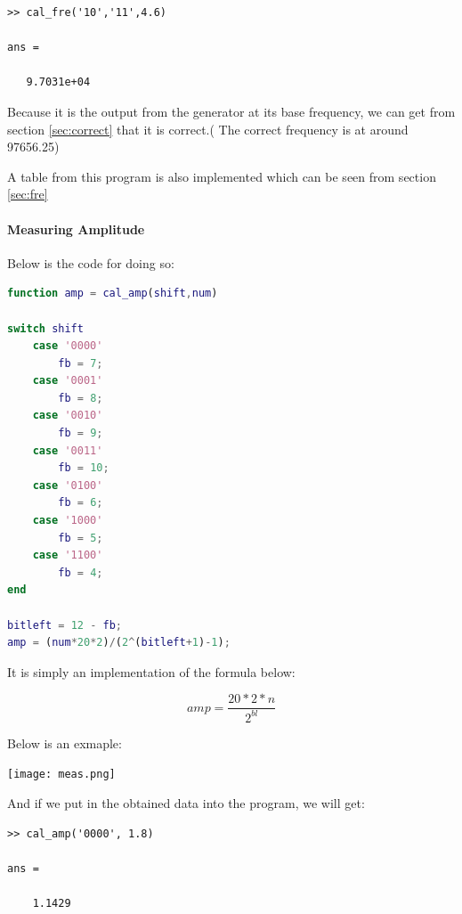 \documentclass[11pt]{scrartcl}
\begin{document}
\begin{verbatim}
>> cal_fre('10','11',4.6)

ans =

   9.7031e+04
\end{verbatim}

Because it is the output from the generator at its base frequency, we can get from section \ref{sec:correct} that it is correct.( The correct frequency is at around 97656.25)

A table from this program is also implemented which can be seen from section \ref{sec:fre}

\paragraph{Measuring Amplitude}
Below is the code for doing so:

\begin{lstlisting}[language=Matlab]
function amp = cal_amp(shift,num)

switch shift
    case '0000'
        fb = 7;
    case '0001'
        fb = 8;
    case '0010'
        fb = 9;
    case '0011'
        fb = 10;
    case '0100'
        fb = 6;
    case '1000'
        fb = 5;
    case '1100'
        fb = 4;
end

bitleft = 12 - fb;
amp = (num*20*2)/(2^(bitleft+1)-1);
\end{lstlisting}
It is simply an implementation of the formula below:

$$amp = \frac{20*2*n}{2^{bl}}$$

Below is an exmaple:
\begin{center}     
\begin{minipage}[t]{\linewidth}

{
\texttt{[image: meas.png]}
}
\end{minipage}
\medskip
\end{center}

And if we put in the obtained data into the program, we will get:

\begin{verbatim}
>> cal_amp('0000', 1.8)

ans =

    1.1429
\end{verbatim}
\end{document}

